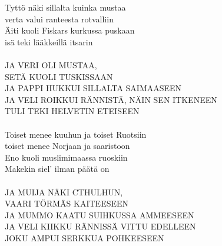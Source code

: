 
            Tyttö näki sillalta kuinka mustaa \\
            verta valui ranteesta rotvalliin \\
            Äiti kuoli Fiskars kurkussa puskaan \\
            isä teki lääkkeillä itsarin \\
\hspace{10mm} \\
            JA VERI OLI MUSTAA, \\
            SETÄ KUOLI TUSKISSAAN \\
            JA PAPPI HUKKUI SILLALTA SAIMAASEEN \\
            JA VELI ROIKKUI RÄNNISTÄ, NÄIN SEN ITKENEEN \\
            TULI TEKI HELVETIN ETEISEEN \\
\hspace{10mm} \\
            Toiset menee kuuhun ja toiset Ruotsiin \\
            toiset menee Norjaan ja saaristoon \\
            Eno kuoli muslimimaassa ruoskiin \\
            Makekin siel’ ilman päätä on \\
\hspace{10mm} \\
            JA MUIJA NÄKI CTHULHUN, \\
            VAARI TÖRMÄS KAITEESEEN \\
            JA MUMMO KAATU SUIHKUSSA AMMEESEEN \\
            JA VELI KIIKKU RÄNNISSÄ VITTU EDELLEEN \\
            JOKU AMPUI SERKKUA POHKEESEEN \\
